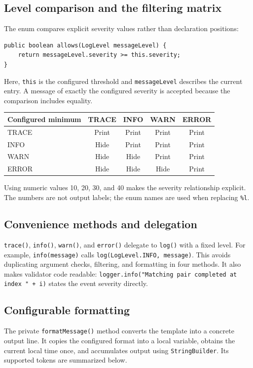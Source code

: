 \documentclass[12pt,a4paper]{article}
\newcommand{\code}[1]{\texttt{#1}}
\begin{document}
\begin{samepage}
\subsection{Level comparison and the filtering matrix}
The enum compares explicit severity values rather than declaration positions:
\begin{lstlisting}
public boolean allows(LogLevel messageLevel) {
    return messageLevel.severity >= this.severity;
}
\end{lstlisting}
\end{samepage}
Here, \code{this} is the configured threshold and \code{messageLevel} describes the current entry. A message of exactly the configured severity is accepted because the comparison includes equality.

\begin{center}\small
\begin{tabular}{@{}lcccc@{}}
\toprule
\textbf{Configured minimum} & \textbf{TRACE} & \textbf{INFO} & \textbf{WARN} & \textbf{ERROR}\\
\midrule
TRACE & Print & Print & Print & Print\\
INFO & Hide & Print & Print & Print\\
WARN & Hide & Hide & Print & Print\\
ERROR & Hide & Hide & Hide & Print\\
\bottomrule
\end{tabular}
\end{center}
Using numeric values 10, 20, 30, and 40 makes the severity relationship explicit. The numbers are not output labels; the enum names are used when replacing \code{\%l}.

\subsection{Convenience methods and delegation}
\code{trace()}, \code{info()}, \code{warn()}, and \code{error()} delegate to \code{log()} with a fixed level. For example, \code{info(message)} calls \code{log(LogLevel.INFO, message)}. This avoids duplicating argument checks, filtering, and formatting in four methods. It also makes validator code readable: \code{logger.info("Matching pair completed at index " + i)} states the event severity directly.

\subsection{Configurable formatting}
The private \code{formatMessage()} method converts the template into a concrete output line. It copies the configured format into a local variable, obtains the current local time once, and accumulates output using \code{StringBuilder}. Its supported tokens are summarized below.
\end{document}

